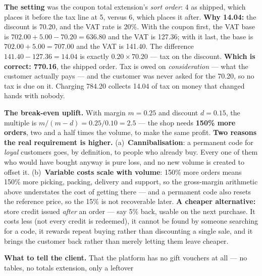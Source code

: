 \begin{ans}
  \item \textbf{The setting} was the coupon total extension's \emph{sort
        order}: 4 as shipped, which places it before the tax line at 5, versus
        6, which places it after. \textbf{Why 14.04:} the discount is 70.20,
        and the VAT rate is 20\%. With the coupon first, the VAT base is
        $702.00 + 5.00 - 70.20 = 636.80$ and the VAT is 127.36; with it last,
        the base is $702.00 + 5.00 = 707.00$ and the VAT is 141.40. The
        difference $141.40 - 127.36 = 14.04$ is exactly $0.20 \times 70.20$ ---
        tax on the discount. \textbf{Which is correct: 770.16}, the shipped
        order. Tax is owed on \emph{consideration} --- what the customer
        actually pays --- and the customer was never asked for the 70.20, so no
        tax is due on it. Charging 784.20 collects 14.04 of tax on money that
        changed hands with nobody.
  \item \textbf{The break-even uplift.} With margin $m = 0.25$ and discount
        $d = 0.15$, the multiple is $m/(m-d) = 0.25/0.10 = \mathbf{2.5}$ ---
        the shop needs \textbf{150\% more orders}, two and a half times the
        volume, to make the same profit. \textbf{Two reasons the real
        requirement is higher.} (a)~\textbf{Cannibalisation}: a permanent code
        for \emph{loyal} customers goes, by definition, to people who already
        buy. Every one of them who would have bought anyway is pure loss, and
        no new volume is created to offset it. (b)~\textbf{Variable costs scale
        with volume}: 150\% more orders means 150\% more picking, packing,
        delivery and support, so the gross-margin arithmetic above understates
        the cost of getting there --- and a permanent code also resets the
        reference price, so the 15\% is not recoverable later.
        \textbf{A cheaper alternative:} store credit issued \emph{after} an
        order --- say 5\% back, usable on the next purchase. It costs less (not
        every credit is redeemed), it cannot be found by someone searching for
        a code, it rewards repeat buying rather than discounting a single sale,
        and it brings the customer back rather than merely letting them leave
        cheaper.
  \item \textbf{What to tell the client.} That the platform has no gift
        vouchers at all --- no tables, no totals extension, only a leftover

\end{ans}
